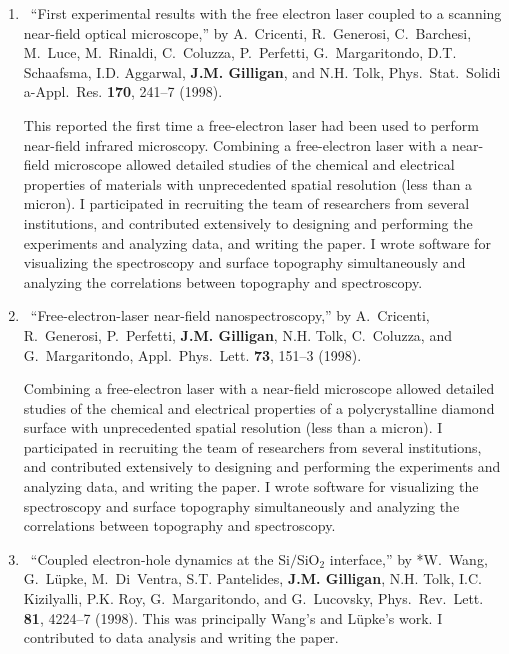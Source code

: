 \begin{enumerate}
%	
	\item
	\textdagger\ 
	\enquote{First experimental results with the free electron laser coupled to a
	  scanning near-field optical microscope,}  by A.~Cricenti, R.~Generosi,
	  C.~Barchesi, M.~Luce, M.~Rinaldi, C.~Coluzza, P.~Perfetti, G.~Margaritondo,
	  D.T. Schaafsma, I.D. Aggarwal, \textbf{J.M. Gilligan}, and N.H. Tolk, Phys.\
	  Stat.\ Solidi a-Appl.\ Res. \textbf{170}, 241--7 (1998). 
	  \begin{credit}
	  This reported the first time a free-electron laser had been used to perform near-field infrared microscopy. Combining a free-electron laser with a near-field microscope allowed detailed studies of the chemical and electrical properties of materials with unprecedented spatial resolution (less than a micron). 
	  I participated in recruiting the team of researchers from several institutions, and contributed extensively to designing and performing the experiments and analyzing data, and writing the paper. I wrote software for visualizing the spectroscopy and surface topography simultaneously and analyzing the correlations between topography and spectroscopy.
	  \end{credit}
%	
	\item
	\textdagger\ 
	\enquote{Free-electron-laser near-field nanospectroscopy,}  by A.~Cricenti,
	  R.~Generosi, P.~Perfetti, \textbf{J.M. Gilligan}, N.H. Tolk, C.~Coluzza, and
	  G.~Margaritondo, Appl.\ Phys.\ Lett. \textbf{73}, 151--3 (1998). 
	  \begin{credit}
	  Combining a free-electron laser with a near-field microscope allowed detailed studies of the chemical and electrical properties of a polycrystalline diamond surface with unprecedented spatial resolution (less than a micron). 
	  I participated in recruiting the team of researchers from several institutions, and contributed extensively to designing and performing the experiments and analyzing data, and writing the paper. I wrote software for visualizing the spectroscopy and surface topography simultaneously and analyzing the correlations between topography and spectroscopy.
	  \end{credit}
%	
	\item
	\textdagger\ 
	\enquote{Coupled electron-hole dynamics at the {Si$/$SiO$_2$} interface,}  by
	  *W.~Wang, G.~L\"upke, M.~Di~Ventra, S.T. Pantelides, \textbf{J.M. Gilligan}, N.H.
	  Tolk, I.C. Kizilyalli, P.K. Roy, G.~Margaritondo, and G.~Lucovsky, Phys.\
	  Rev.\ Lett. \textbf{81}, 4224--7 (1998). This was principally Wang's and L\"upke's work. I contributed to data analysis and writing the paper.

\end{enumerate}
